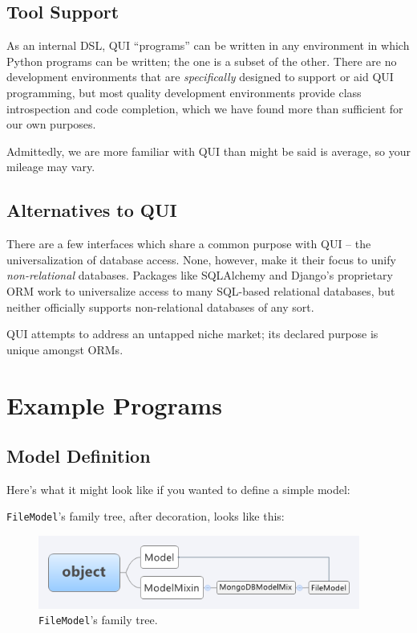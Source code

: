 \documentclass{article} %
\newcommand{\il}[1]{\mbox{\lstinline{#1}}}
\begin{document}
\subsection{Tool Support}
As an internal DSL, QUI ``programs'' can be written in any environment in which Python programs can be written; the one is a subset of the 
other. There are no development environments that are \emph{specifically} designed to support or aid QUI programming, but most quality
development environments provide class introspection and code completion, which we have found more than sufficient for our own
purposes. 

Admittedly, we are more familiar with QUI than might be said is average, so your mileage may vary.

\subsection{Alternatives to QUI}
There are a few interfaces which share a common purpose with QUI -- the universalization of database access. None, however,
make it their focus to unify \emph{non-relational} databases. Packages like SQLAlchemy and Django's proprietary ORM work to
universalize access to many SQL-based relational databases, but neither officially supports non-relational databases of any sort.

QUI attempts to address an untapped niche market; its declared purpose is unique amongst ORMs.
\newpage
\section{Example Programs}
\label{examples}
\subsection{Model Definition}
Here's what it might look like if you wanted to define a simple model:

\il{FileModel}'s family tree, after decoration, looks like this:
\begin{figure}[htb]
\centering
\includegraphics[width=400px]{FileModelInheritanceTree}
\caption{\il{FileModel}'s family tree.}
\end{figure}
\end{document}
